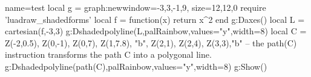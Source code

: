 \documentclass{standalone}%
\begin{document}
\begin{luadraw}{name=test}
local g = graph:new{window={-3,3,-1,9}, size={12,12,0} }
require 'luadraw_shadedforms'
local f = function(x) return x^2 end
g:Daxes()
local L = cartesian(f,-3,3)
g:Dshadedpolyline(L,palRainbow,{values="y",width=8})
local C = {Z(-2,0.5), Z(0,-1), Z(0,7), Z(1,7.8), "b", Z(2,1), Z(2,4), Z(3,3),"b"}
-- the path(C) instruction transforms the path C into a polygonal line.
g:Dshadedpolyline(path(C),palRainbow,{values="y",width=8})
g:Show()
\end{luadraw}
\end{document}
